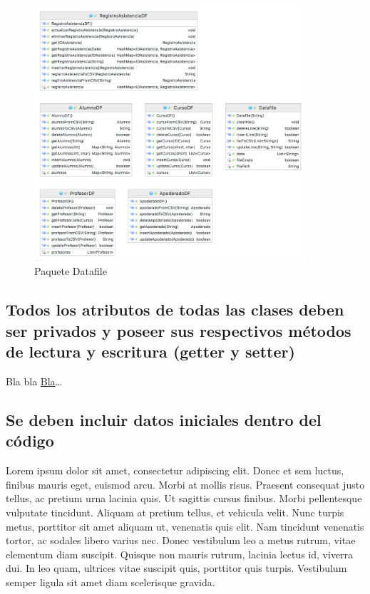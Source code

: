\begin{figure}[h]
    \centering
    \includegraphics[width=0.9\textwidth]{contents/img/img3}
    \caption{Paquete Datafile}
    \label{fig:img3}
\end{figure}

\subsection{Todos los atributos de todas las clases deben ser privados y poseer sus respectivos métodos de lectura y escritura (getter y setter)}

Bla bla \hyperref[subsec:blablabla]{Bla}\dots

\subsection{Se deben incluir datos iniciales dentro del código}

Lorem ipsum dolor sit amet, consectetur adipiscing elit. Donec et sem luctus, finibus mauris eget, euismod arcu. Morbi at mollis risus. Praesent consequat justo tellus, ac pretium urna lacinia quis. Ut sagittis cursus finibus. Morbi pellentesque vulputate tincidunt. Aliquam at pretium tellus, et vehicula velit. Nunc turpis metus, porttitor sit amet aliquam ut, venenatis quis elit. Nam tincidunt venenatis tortor, ac sodales libero varius nec. Donec vestibulum leo a metus rutrum, vitae elementum diam suscipit. Quisque non mauris rutrum, lacinia lectus id, viverra dui. In leo quam, ultrices vitae suscipit quis, porttitor quis turpis. Vestibulum semper ligula sit amet diam scelerisque gravida.

